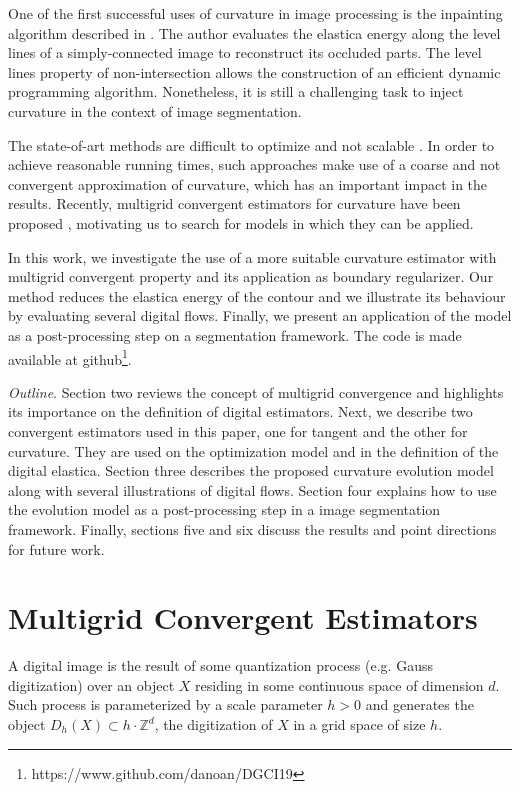 \documentclass[runningheads]{llncs}
\begin{document}
One of the first successful uses of curvature in image processing is the inpainting algorithm described in \cite{masnou98}. The author evaluates the elastica energy along the level lines of a simply-connected image to reconstruct its occluded parts. The level lines property of non-intersection allows the construction of an efficient dynamic programming algorithm. Nonetheless, it is still a challenging task to inject curvature in the context of image segmentation. 

The state-of-art methods are difficult to optimize and  not scalable \cite{zehiry10,schoenemann09,nieuwenhuis14}. In order to achieve reasonable running times, such approaches make use of a coarse and not convergent approximation of curvature, which has an important impact in the results. Recently, multigrid convergent estimators for curvature have been proposed \cite{schindele17,coeurjolly13,roussillon11}, motivating us to search for models in which they can be applied.

In this work, we investigate the use of a more suitable curvature estimator with multigrid convergent property and its application as boundary regularizer. Our method reduces the elastica energy of the contour and we illustrate its behaviour by evaluating several digital flows. Finally, we present an application of the model as a post-processing step on a segmentation framework. The code is made available at github\footnote{https://www.github.com/danoan/DGCI19}.

\textit{Outline}. Section two reviews the concept of multigrid convergence and highlights its importance on the definition of digital estimators. Next, we describe two convergent estimators used in this paper, one for tangent and the other for curvature. They are used on the optimization model and in the definition of the digital elastica. Section three describes the proposed curvature evolution model along with several illustrations of digital flows. Section four explains how to use the evolution model as a post-processing step in a image segmentation framework. Finally, sections five and six discuss the results and point directions for future work.




\section{Multigrid Convergent Estimators}



A digital image is the result of some quantization process (e.g. Gauss digitization) over an object $X$ residing in some continuous space of dimension $d$. Such process is parameterized by a scale parameter $h>0$ and generates the object $D_h(X) \subset h \cdot \mathbb{Z}^d$, the digitization of $X$ in a grid space of size $h$. 
\end{document}
